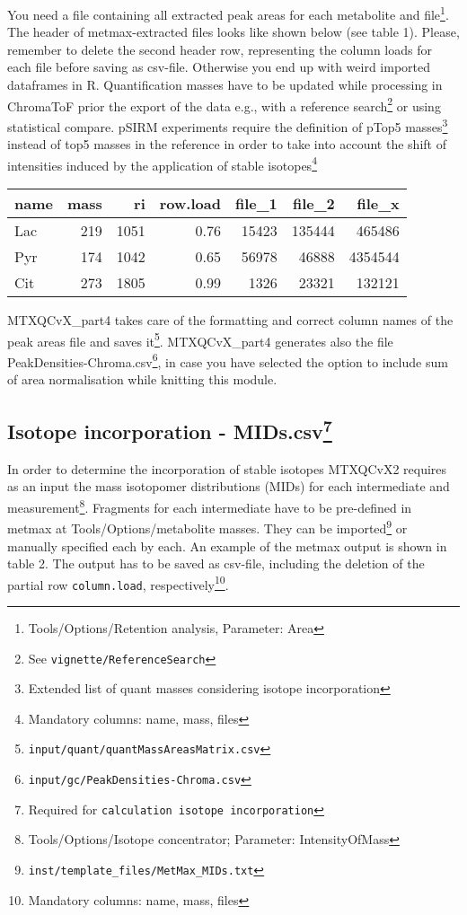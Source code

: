 \documentclass[]{book}
\let\rmarkdownfootnote\footnote%
\def\footnote{\protect\rmarkdownfootnote}
\theoremstyle{definition}
\theoremstyle{definition}
\theoremstyle{definition}
\theoremstyle{remark}
\begin{document}
You need a file containing all extracted peak areas for each metabolite
and file\footnote{Tools/Options/Retention analysis, Parameter: Area}.
The header of metmax-extracted files looks like shown below (see table
1). Please, remember to delete the second header row, representing the
column loads for each file before saving as csv-file. Otherwise you end
up with weird imported dataframes in R. Quantification masses have to be
updated while processing in ChromaToF prior the export of the data e.g.,
with a reference search\footnote{See \texttt{vignette/ReferenceSearch}}
or using statistical compare. pSIRM experiments require the definition
of pTop5 masses\footnote{Extended list of quant masses considering
  isotope incorporation} instead of top5 masses in the reference in
order to take into account the shift of intensities induced by the
application of stable isotopes\footnote{Mandatory columns: name, mass,
  files}

\begin{tabular}{l|r|r|r|r|r|r}
\hline
name & mass & ri & row.load & file\_1 & file\_2 & file\_x\\
\hline
Lac & 219 & 1051 & 0.76 & 15423 & 135444 & 465486\\
\hline
Pyr & 174 & 1042 & 0.65 & 56978 & 46888 & 4354544\\
\hline
Cit & 273 & 1805 & 0.99 & 1326 & 23321 & 132121\\
\hline
\end{tabular}

MTXQCvX\_part4 takes care of the formatting and correct column names of
the peak areas file and saves it\footnote{\texttt{input/quant/quantMassAreasMatrix.csv}}.
MTXQCvX\_part4 generates also the file
PeakDensities-Chroma.csv\footnote{\texttt{input/gc/PeakDensities-Chroma.csv}},
in case you have selected the option to include sum of area
normalisation while knitting this module.

\subsection[Isotope incorporation - MIDs.csv]{\texorpdfstring{Isotope
incorporation - MIDs.csv\footnote{Required for
  \texttt{calculation\ isotope\ incorporation}}}{Isotope incorporation - MIDs.csv}}\label{isotope-incorporation---mids.csv}

In order to determine the incorporation of stable isotopes MTXQCvX2
requires as an input the mass isotopomer distributions (MIDs) for each
intermediate and measurement\footnote{Tools/Options/Isotope
  concentrator; Parameter: IntensityOfMass}. Fragments for each
intermediate have to be pre-defined in metmax at
Tools/Options/metabolite masses. They can be imported\footnote{\texttt{inst/template\_files/MetMax\_MIDs.txt}}
or manually specified each by each. An example of the metmax output is
shown in table 2. The output has to be saved as csv-file, including the
deletion of the partial row \texttt{column.load}, respectively\footnote{Mandatory
  columns: name, mass, files}.
\end{document}
